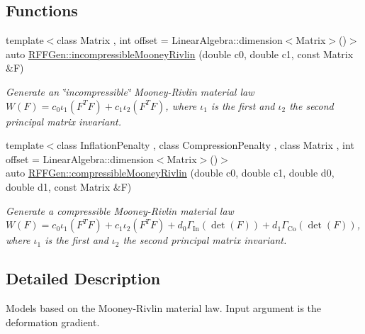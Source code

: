 \subsection*{Functions}
\begin{DoxyCompactItemize}
\item 
\hypertarget{group__Rubber_ga8626dcc0c5d11d3d2d796d09457e5e5d}{{\footnotesize template$<$class Matrix , int offset = Linear\-Algebra\-::dimension$<$\-Matrix$>$()$>$ }\\auto \hyperlink{group__Rubber_ga8626dcc0c5d11d3d2d796d09457e5e5d}{R\-F\-F\-Gen\-::incompressible\-Mooney\-Rivlin} (double c0, double c1, const Matrix \&F)}\label{group__Rubber_ga8626dcc0c5d11d3d2d796d09457e5e5d}

\begin{DoxyCompactList}\small\item\em Generate an \char`\"{}incompressible\char`\"{} Mooney-\/\-Rivlin material law $ W(F)=c_0\iota_1(F^T F) + c_1\iota_2(F^T F) $, where $\iota_1$ is the first and $\iota_2$ the second principal matrix invariant. \end{DoxyCompactList}\item 
\hypertarget{group__Rubber_ga1522c73c1e2eec5516b73b203150c7e1}{{\footnotesize template$<$class Inflation\-Penalty , class Compression\-Penalty , class Matrix , int offset = Linear\-Algebra\-::dimension$<$\-Matrix$>$()$>$ }\\auto \hyperlink{group__Rubber_ga1522c73c1e2eec5516b73b203150c7e1}{R\-F\-F\-Gen\-::compressible\-Mooney\-Rivlin} (double c0, double c1, double d0, double d1, const Matrix \&F)}\label{group__Rubber_ga1522c73c1e2eec5516b73b203150c7e1}

\begin{DoxyCompactList}\small\item\em Generate a compressible Mooney-\/\-Rivlin material law $ W(F)=c_0\iota_1(F^T F) + c_1\iota_2(F^T F) + d_0\Gamma_\mathrm{In}(\det(F))+d_1\Gamma_\mathrm{Co}(\det(F)) $, where $\iota_1$ is the first and $\iota_2$ the second principal matrix invariant. \end{DoxyCompactList}\end{DoxyCompactItemize}


\subsection{Detailed Description}
Models based on the Mooney-\/\-Rivlin material law. Input argument is the deformation gradient. 